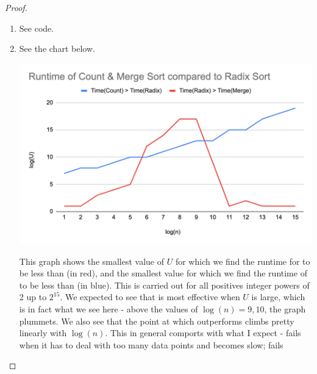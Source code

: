 \documentclass[11pt]{article}
\begin{document}
\begin{enumerate}
\begin{proof}
\begin{enumerate}[label = (\alph*)]
\item

See code.

\item 

See the chart below.

\includegraphics[width = 5in]{1-1}

This graph shows the smallest value of $U$ for which we find the runtime for \MergeSort to be less than \RadixSort (in red), and the smallest value for which we find the runtime of \RadixSort to be less than \CountingSort (in blue). This is carried out for all positives integer powers of 2 up to $2^{15}$. We expected to see that \MergeSort is most effective when $U$ is large, which is in fact what we see here - above the values of $\log(n) = 9, 10$, the graph plummets. We also see that the point at which \RadixSort outperforms \CountingSort climbs pretty linearly with $\log (n)$. This in general comports with what I expect - \MergeSort fails when it has to deal with too many data points and becomes slow; \CountingSort fails
\end{enumerate}
\end{proof}

\end{enumerate}
\end{document}
